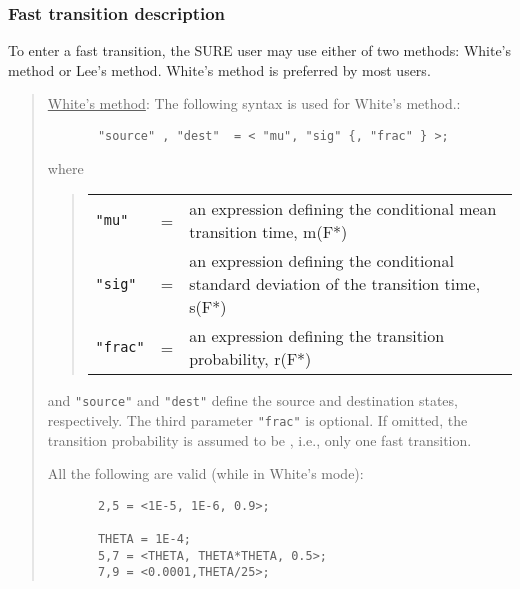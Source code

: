 \subsubsection{Fast transition description} To enter a fast transition,
 the SURE user may use either of two methods: White's method or Lee's method.
White's method is preferred by most users.
\begin{quote}
\underline{White's method}:  The following syntax is used for White's method.:

\begin{verbatim}
       "source" , "dest"  = < "mu", "sig" {, "frac" } >;
\end{verbatim}
where
\begin{quote}
\begin{tabular}{llp{5.0in}}
        \verb|"mu"| & = & an expression defining the conditional mean transition
        time, m(F*) \\

        \verb|"sig"| & = & an expression defining the conditional standard deviation
        of the transition time, s(F*) \\

        \verb|"frac"| & = & an expression defining the transition probability, r(F*)
        \\
\end{tabular}
\end{quote}
and \verb|"source"| and \verb|"dest"| define the source and destination
states, respectively.  The third parameter \verb|"frac"| is optional.  If
omitted, the transition probability is assumed to be {}, i.e., only
one fast transition.


All the following are valid (while in White's mode):
\begin{verbatim}
       2,5 = <1E-5, 1E-6, 0.9>;

       THETA = 1E-4;
       5,7 = <THETA, THETA*THETA, 0.5>;
       7,9 = <0.0001,THETA/25>;
\end{verbatim}
\end{quote}

